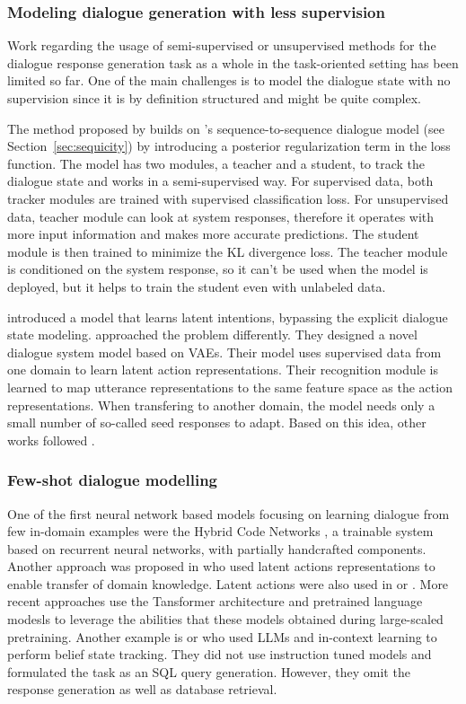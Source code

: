 \subsubsection{Modeling dialogue generation with less supervision}
Work regarding the usage of semi-supervised or unsupervised methods for the dialogue response generation task as a whole in the task-oriented setting has been limited so far.
One of the main challenges is to model the dialogue state with no supervision since it is by definition structured and might be quite complex.

The method proposed by \citet{jin2018explicit} builds on \citet{lei2018sequicity}'s sequence-to-sequence dialogue model (see Section~\ref{sec:sequicity}) by introducing a posterior regularization term in the loss function.
The model has two modules, a teacher and a student, to track the dialogue state and works in a semi-supervised way.
For supervised data, both tracker modules are trained with supervised classification loss.
For unsupervised data, teacher module can look at system responses, therefore it operates with more input information and makes more accurate predictions.
The student module is then trained to minimize the KL divergence loss.
The teacher module is conditioned on the system response, so it can't be used when the model is deployed, but it helps to train the student even with unlabeled data.

\citet{wen2017latent} introduced a model that learns latent intentions, bypassing the explicit dialogue state modeling.
\citet{zhao-eskenazi-2018-zero} approached the problem differently.
They designed a novel dialogue system model based on VAEs.
Their model uses supervised data from one domain to learn latent action representations.
Their recognition module is learned to map utterance representations to the same feature space as the action representations.
When transfering to another domain, the model needs only a small number of so-called seed responses to adapt.
Based on this idea, other works followed \citep{shalyminov-etal-2019-shot, huang2019mala}.

\subsubsection{Few-shot dialogue modelling}
One of the first neural network based models focusing on learning dialogue from few in-domain examples were the Hybrid Code Networks  \cite{williams-etal-2017-hybrid}, a trainable system based on recurrent neural networks, with partially handcrafted components.
Another approach  was proposed in \citet{zhao-eskenazi-2018-zero} who used latent actions representations to enable transfer of domain knowledge.
Latent actions were also used in \citet{huang2020mala} or \citet{shalyminov-etal-2019-data}.
More recent approaches use the Tansformer architecture and pretrained language modesls \cite{shalyminov_fast_2020} to leverage the abilities that these models obtained during large-scaled pretraining.
Another example is \citet{madotto2020language} or
\citet{hu-etal-2022-context} who used LLMs and in-context learning to perform belief state tracking.
They did not use instruction tuned models and formulated the task as an SQL query generation.
However, they omit the response generation as well as database retrieval.
